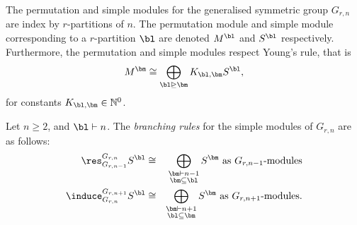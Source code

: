 \documentclass[11pt]{report}
\begin{document}
\begin{lemma}
	The permutation and simple modules for the generalised symmetric group $G_{r,n}$ are index by $r$-partitions of $n$. The permutation module and simple module corresponding to a $r$-partition $\bl$ are denoted $M^{\bl}$ and $S^{\bl}$ respectively. 
	Furthermore, the permutation and simple modules respect Young's rule, that is 
	\[M^{\bm} \cong \bigoplus_{\bl \trianglerighteq \bm} K_{\bl,\bm} S^{\bl},\]
	for constants $K_{\bl,\bm} \in \mathbb{N}^{0}$.
\end{lemma}

\begin{conj}
	Let $n \geq 2$, and $\bl \vdash n$. The \emph{branching rules} for the simple modules of $G_{r,n}$ are as follows:
	\begin{eqnarray}
	\res_{G_{r,n-1}}^{G_{r,n}} S^{\bl} & \cong & \bigoplus_{\substack{\bm \vdash n-1 \\ \bm \subseteq \bl}} S^{\bm} \textnormal{ as $G_{r,n-1}$-modules} \\
	\induce_{G_{r,n}}^{G_{r,n+1}} S^{\bl} & \cong &\bigoplus_{\substack{\bm \vdash n+1 \\ \bl \subseteq \bm }} S^{\bm} \textnormal{ as $G_{r,n+1}$-modules}.
	\end{eqnarray}
\end{conj}
\end{document}
